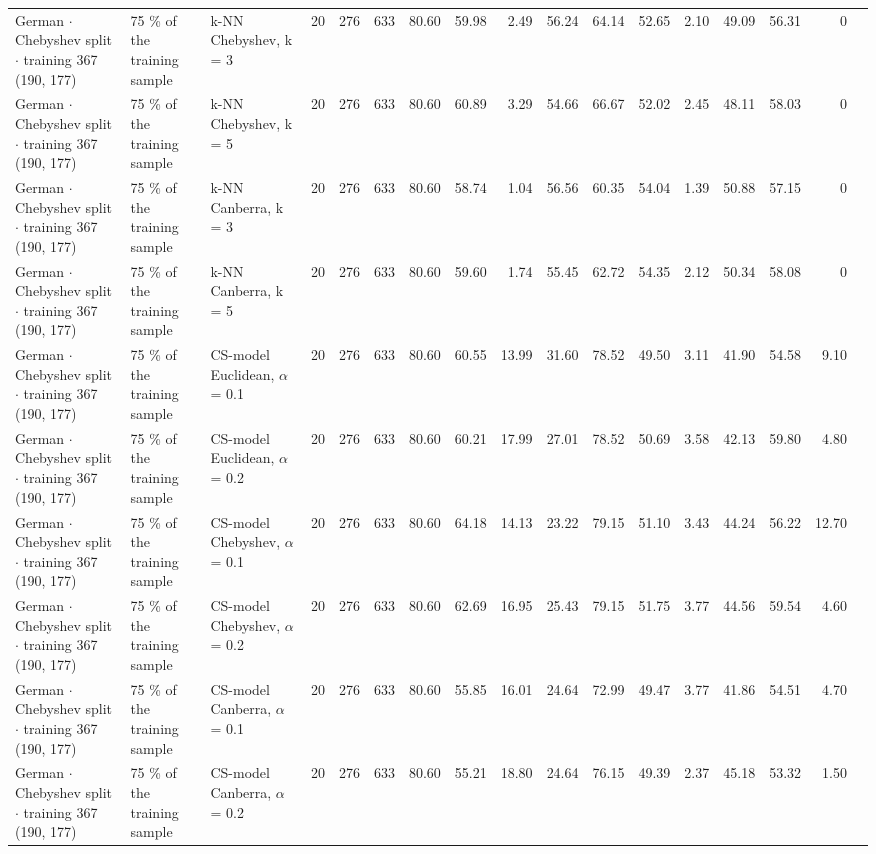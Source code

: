 \begin{longtable}{lllrrrrrrrrrrrrrl}
  German $\cdot$ Chebyshev split $\cdot$ training 367 (190, 177) & 75 \% of the training sample & k-NN Chebyshev, k = 3 & 20 & 276 & 633 & 80.60 & 59.98 & 2.49 & 56.24 & 64.14 & 52.65 & 2.10 & 49.09 & 56.31 & 0 &  \\
  German $\cdot$ Chebyshev split $\cdot$ training 367 (190, 177) & 75 \% of the training sample & k-NN Chebyshev, k = 5 & 20 & 276 & 633 & 80.60 & 60.89 & 3.29 & 54.66 & 66.67 & 52.02 & 2.45 & 48.11 & 58.03 & 0 &  \\
  German $\cdot$ Chebyshev split $\cdot$ training 367 (190, 177) & 75 \% of the training sample & k-NN Canberra, k = 3 & 20 & 276 & 633 & 80.60 & 58.74 & 1.04 & 56.56 & 60.35 & 54.04 & 1.39 & 50.88 & 57.15 & 0 &  \\
  German $\cdot$ Chebyshev split $\cdot$ training 367 (190, 177) & 75 \% of the training sample & k-NN Canberra, k = 5 & 20 & 276 & 633 & 80.60 & 59.60 & 1.74 & 55.45 & 62.72 & 54.35 & 2.12 & 50.34 & 58.08 & 0 &  \\
  German $\cdot$ Chebyshev split $\cdot$ training 367 (190, 177) & 75 \% of the training sample & CS-model Euclidean, $\alpha$ = 0.1 & 20 & 276 & 633 & 80.60 & 60.55 & 13.99 & 31.60 & 78.52 & 49.50 & 3.11 & 41.90 & 54.58 & 9.10 &  \\
  German $\cdot$ Chebyshev split $\cdot$ training 367 (190, 177) & 75 \% of the training sample & CS-model Euclidean, $\alpha$ = 0.2 & 20 & 276 & 633 & 80.60 & 60.21 & 17.99 & 27.01 & 78.52 & 50.69 & 3.58 & 42.13 & 59.80 & 4.80 &  \\
  German $\cdot$ Chebyshev split $\cdot$ training 367 (190, 177) & 75 \% of the training sample & CS-model Chebyshev, $\alpha$ = 0.1 & 20 & 276 & 633 & 80.60 & 64.18 & 14.13 & 23.22 & 79.15 & 51.10 & 3.43 & 44.24 & 56.22 & 12.70 &  \\
  German $\cdot$ Chebyshev split $\cdot$ training 367 (190, 177) & 75 \% of the training sample & CS-model Chebyshev, $\alpha$ = 0.2 & 20 & 276 & 633 & 80.60 & 62.69 & 16.95 & 25.43 & 79.15 & 51.75 & 3.77 & 44.56 & 59.54 & 4.60 &  \\
  German $\cdot$ Chebyshev split $\cdot$ training 367 (190, 177) & 75 \% of the training sample & CS-model Canberra, $\alpha$ = 0.1 & 20 & 276 & 633 & 80.60 & 55.85 & 16.01 & 24.64 & 72.99 & 49.47 & 3.77 & 41.86 & 54.51 & 4.70 &  \\
  German $\cdot$ Chebyshev split $\cdot$ training 367 (190, 177) & 75 \% of the training sample & CS-model Canberra, $\alpha$ = 0.2 & 20 & 276 & 633 & 80.60 & 55.21 & 18.80 & 24.64 & 76.15 & 49.39 & 2.37 & 45.18 & 53.32 & 1.50 &  \\

\end{longtable}
